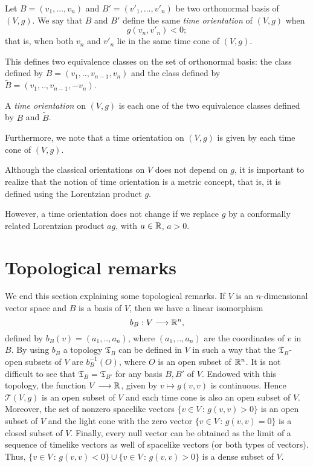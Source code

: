 Let $B = (v_1, \dots, v_n)$ and $B' = (v'_1, \dots, v'_n)$ be two orthonormal basis of $(V,g)$. We say that $B$ and $B'$ define the same \emph{time orientation} of $(V,g)$ when
\[
	g(v_n, v'_n) < 0;
\]
that is, when both $v_n$ and $v'_n$ lie in the same time cone of $(V,g)$.

This defines two equivalence classes on the set of orthonormal basis: the class defined by $B=(v_1,..,v_{n-1},v_n)$ and the class defined by $\tilde{B}=(v_1,..,v_{n-1},-v_n)$.

\begin{definition}
	A \emph{time orientation} on $(V,g)$ is each one of the two equivalence classes defined by $B$ and $\tilde{B}$.
\end{definition}

Furthermore, we note that a time orientation on $(V,g)$ is given by each time cone of $(V,g)$.

Although the classical orientations on $V$ does not depend on $g$, it is important to realize that the notion of time orientation is a metric concept, that is, it is defined using the Lorentzian product $g$.

However, a time orientation does not change if we replace $g$ by a conformally related Lorentzian product $ag$, with $a\in \mathbb{R}$, $a>0$.

\section{Topological remarks}

We end this section explaining some topological remarks. If $V$ is an $n$-dimensional vector space and $B$ is a basis of $V$, then we have a linear isomorphism $$b_B : V \longrightarrow \mathbb{R}^n,$$ defined by $b_B(v)=(a_1,..,a_n)$, where $(a_1,..,a_n)$ are the coordinates of $v$ in $B$. By using $b_B$ a topology $\mathfrak{T}_B$ can be defined in $V$ in such a way that the $\mathfrak{T}_B$-open subsets of $V$ are $b_B^{-1}(O)$, where $O$ is an open subset of $\mathbb{R}^n$. It is not difficult to see that $\mathfrak{T}_B = \mathfrak{T}_{B'}$ for any basis $B,B'$ of $V$. Endowed with this topology, the function $V \longrightarrow \mathbb{R}$, given by $v \mapsto g(v,v)$ is continuous. Hence $\mathcal{T}(V,g)$ is an open subset of $V$ and each time cone is also an open subset of $V$. Moreover, the set of nonzero spacelike vectors $\{v\in V \, : \, g(v,v)>0 \}$ is an open subset of $V$ and the light cone with the zero vector $\{v\in V \, : \, g(v,v)=0 \}$ is a closed subset of $V$. Finally, every null vector can be obtained as the limit of a sequence of timelike vectors as well of spacelike vectors (or both types of vectors). Thus, $\{v\in V \, : \, g(v,v)<0 \} \cup \{v\in V \, : \, g(v,v)>0 \}$
is a dense subset of $V$.
